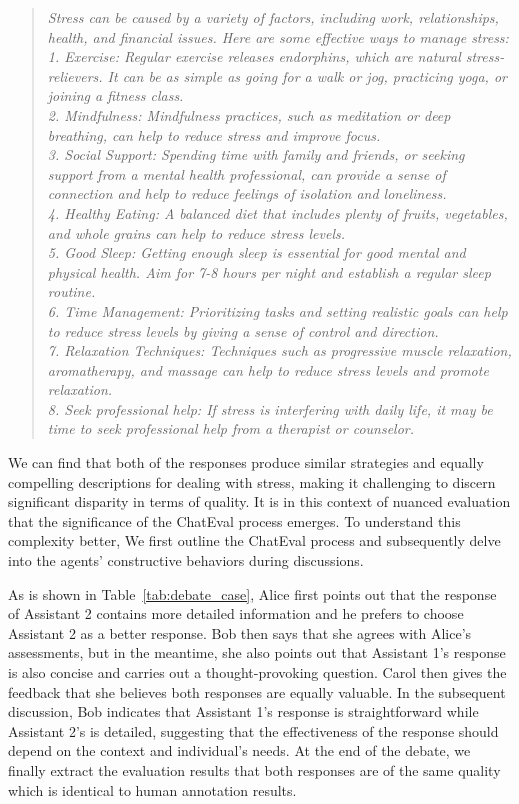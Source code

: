 \begin{quote}
\textit{Stress can be caused by a variety of factors, including work, relationships, health, and financial issues. Here are some effective ways to manage stress: \\
1. Exercise: Regular exercise releases endorphins, which are natural stress-relievers. It can be as simple as going for a walk or jog, practicing yoga, or joining a fitness class. \\
2. Mindfulness: Mindfulness practices, such as meditation or deep breathing, can help to reduce stress and improve focus. \\
3. Social Support: Spending time with family and friends, or seeking support from a mental health professional, can provide a sense of connection and help to reduce feelings of isolation and loneliness. \\
4. Healthy Eating: A balanced diet that includes plenty of fruits, vegetables, and whole grains can help to reduce stress levels. \\
5. Good Sleep: Getting enough sleep is essential for good mental and physical health. Aim for 7-8 hours per night and establish a regular sleep routine. \\
6. Time Management: Prioritizing tasks and setting realistic goals can help to reduce stress levels by giving a sense of control and direction. \\
7. Relaxation Techniques: Techniques such as progressive muscle relaxation, aromatherapy, and massage can help to reduce stress levels and promote relaxation. \\
8. Seek professional help: If stress is interfering with daily life, it may be time to seek professional help from a therapist or counselor. \\}
\end{quote}

We can find that both of the responses produce similar strategies and equally compelling descriptions for dealing with stress, making it challenging to discern significant disparity in terms of quality. It is in this context of nuanced evaluation that the significance of the ChatEval process emerges. To understand this complexity better, We first outline the ChatEval process and subsequently delve into the agents' constructive behaviors during discussions.

As is shown in Table~\ref{tab:debate_case}, Alice first points out that the response of Assistant 2 contains more detailed information and he prefers to choose Assistant 2 as a better response. Bob then says that she agrees with Alice's assessments, but in the meantime, she also points out that Assistant 1's response is also concise and carries out a thought-provoking question. Carol then gives the feedback that she believes both responses are equally valuable. In the subsequent discussion, Bob indicates that Assistant 1's response is straightforward while Assistant 2's is detailed, suggesting that the effectiveness of the response should depend on the context and individual's needs. At the end of the debate, we finally extract the evaluation results that both responses are of the same quality which is identical to human annotation results. 

